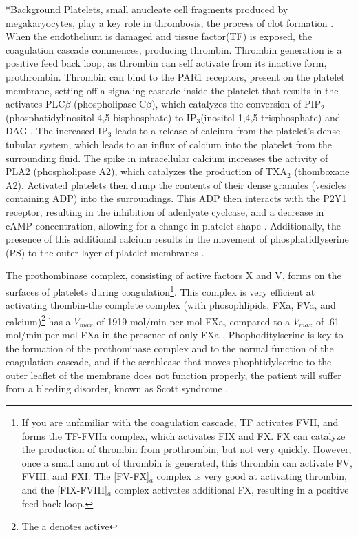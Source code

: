 \documentclass[11pt]{article}
\makeatletter
\renewcommand\section{\@startsection
	{subsection}{2}{0mm}
	{-0.2in}
	{0.05\baselineskip}
	{\normalfont\large\bfseries}}
\makeatother
\begin{document}
\section*{Background}
Platelets, small anucleate cell fragments produced by megakaryocytes, play a key role in thrombosis, the process of clot formation \cite{hoffman2005hematology}. When the endothelium is damaged and tissue factor(TF) is exposed, the coagulation cascade commences, producing thrombin. Thrombin generation is a positive feed back loop, as thrombin can self activate from its inactive form, prothrombin. Thrombin can bind to the PAR1 receptors, present on the platelet membrane, setting off a signaling cascade inside the platelet that results in the activates PLC$\beta$ (phospholipase C$\beta$), which catalyzes the conversion of PIP$_2$ (phosphatidylinositol 4,5-bisphosphate) to IP$_3$(inositol 1,4,5 trisphosphate) and DAG \cite{brass2003thrombin}. The increased IP$_3$ leads to a release of calcium from the platelet's dense tubular system, which leads to an influx of calcium into the platelet from the surrounding fluid. The spike in intracellular calcium increases the activity of PLA2 (phospholipase A2), which catalyzes the production of TXA$_2$ (thomboxane A2). Activated platelets then dump the contents of their dense granules (vesicles containing ADP) into the surroundings. This ADP then interacts with the P2Y1 receptor, resulting in the inhibition of adenlyate cyclcase, and a decrease in cAMP concentration, allowing for a change in platelet shape \cite{hoffman2005hematology}. Additionally, the presence of this additional calcium results in the movement of phosphatidlyserine (PS) to the outer layer of platelet membranes \cite{lhermusier2011platelet}.

The prothombinase complex, consisting of active factors X and V, forms on the surfaces of platelets during coagulation\footnote{If you are unfamiliar with the coagulation cascade, TF activates FVII, and forms the TF-FVIIa complex, which activates FIX and FX. FX can catalyze the production of thrombin from prothrombin, but not very quickly. However, once a small amount of thrombin is generated, this thrombin can activate FV, FVIII, and FXI. The [FV-FX]$_a$ complex is very good at activating thrombin, and the [FIX-FVIII]$_a$ complex activates additional FX, resulting in a positive feed back loop.}. This complex is very efficient at activating thombin-the complete complex (with phosophlipids, FXa, FVa, and calcium)\footnote{The a denotes active} has a $V_{max}$ of 1919 mol/min per mol FXa, compared to a $V_{max}$ of .61 mol/min per mol FXa in the presence of only FXa \cite{rosing1980role}. Phophoditylserine is key to the formation of the prothominase complex and to the normal function of the coagulation cascade, and if the scrablease that moves phophtidylserine to the outer leaflet of the membrane does not function properly, the patient will suffer from a bleeding disorder, known as Scott syndrome \cite{halliez2015detection}. 
\end{document}
